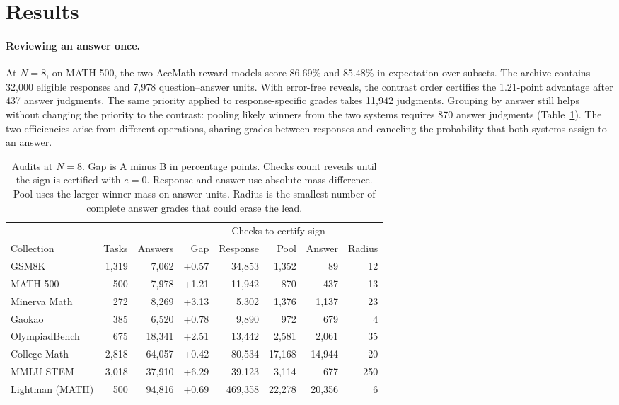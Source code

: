 \documentclass[10pt,letterpaper]{article}
\begin{document}
\section*{Results}
\paragraph{Reviewing an answer once.}
At $N=8$, on MATH-500, the two AceMath reward models score 86.69\% and 85.48\% in expectation over subsets. The archive contains 32,000 eligible responses and 7,978 question--answer units. With error-free reveals, the contrast order certifies the 1.21-point advantage after 437 answer judgments. The same priority applied to response-specific grades takes 11,942 judgments. Grouping by answer still helps without changing the priority to the contrast: pooling likely winners from the two systems requires 870 answer judgments (Table~\ref{tab:eight}). The two efficiencies arise from different operations, sharing grades between responses and canceling the probability that both systems assign to an answer.

\begin{table}[!ht]\centering\small
\caption{Audits at $N=8$. Gap is A minus B in percentage points. Checks count reveals until the sign is certified with $e=0$. Response and answer use absolute mass difference. Pool uses the larger winner mass on answer units. Radius is the smallest number of complete answer grades that could erase the lead.}\label{tab:eight}
\begin{tabular}{lrrrrrrr}\toprule
 & & & & \multicolumn{3}{c}{Checks to certify sign} & \\
Collection & Tasks & Answers & Gap & Response & Pool & Answer & Radius\\\midrule
GSM8K & 1,319 & 7,062 & +0.57 & 34,853 & 1,352 & 89 & 12 \\
MATH-500 & 500 & 7,978 & +1.21 & 11,942 & 870 & 437 & 13 \\
Minerva Math & 272 & 8,269 & +3.13 & 5,302 & 1,376 & 1,137 & 23 \\
Gaokao & 385 & 6,520 & +0.78 & 9,890 & 972 & 679 & 4 \\
OlympiadBench & 675 & 18,341 & +2.51 & 13,442 & 2,581 & 2,061 & 35 \\
College Math & 2,818 & 64,057 & +0.42 & 80,534 & 17,168 & 14,944 & 20 \\
MMLU STEM & 3,018 & 37,910 & +6.29 & 39,123 & 3,114 & 677 & 250 \\
Lightman (MATH) & 500 & 94,816 & +0.69 & 469,358 & 22,278 & 20,356 & 6 \\
\bottomrule\end{tabular}
\end{table}
\end{document}
